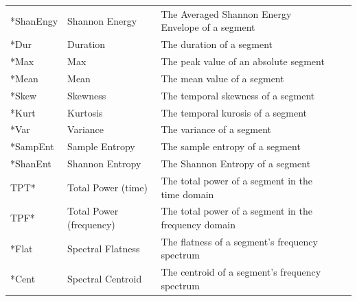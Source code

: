 \documentclass[titlepage, 12pt]{scrartcl} \usepackage{enumitem}
\begin{document}
\begin{table}[H]
\begin{tabulary}{\linewidth}{LLLLL}
*ShanEngy                  & Shannon Energy                                  & The Averaged Shannon Energy Envelope of a segment                                    \\
*Dur                       & Duration                                        & The duration of a segment                                                            \\
*Max                       & Max                                             & The peak value of an absolute segment                                                \\
*Mean                      & Mean                                            & The mean value of a segment                                                          \\
*Skew                      & Skewness                                        & The temporal skewness of a segment                                                   \\
*Kurt                      & Kurtosis                                        & The temporal kurosis of a segment                                                    \\
*Var                       & Variance                                        & The variance of a segment                                                            \\
*SampEnt                   & Sample Entropy                                  & The sample entropy of a segment                                                      \\
*ShanEnt                   & Shannon Entropy                                 & The Shannon Entropy of a segment                                                     \\
TPT*                       & Total Power (time)                              & The total power of a segment in the time domain                                      \\
TPF*                       & Total Power (frequency)                         & The total power of a segment in the frequency domain                                 \\
*Flat                      & Spectral Flatness                               & The flatness of a segment's frequency spectrum                                       \\
*Cent                      & Spectral Centroid                               & The centroid of a segment's frequency spectrum                                       \\

\end{tabulary}
\end{table}
\end{document}
